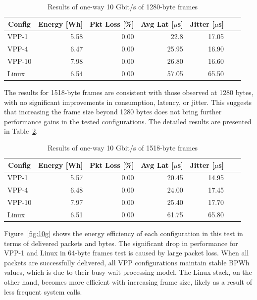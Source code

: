 \begin{table}[h!]
\centering
\caption{Results of one-way 10 Gbit/s of 1280-byte frames}
\begin{tabular}{|l|r|r|r|r|r|r|}
\hline
\multicolumn{1}{|c|}{\textbf{Config}} &
\multicolumn{1}{c|}{\textbf{Energy [Wh] }} &
\multicolumn{1}{c|}{\textbf{Pkt Loss [\%]}} &
\multicolumn{1}{c|}{\textbf{Avg Lat [$\mu$s]}} &
\multicolumn{1}{c|}{\textbf{Jitter [$\mu$s]}} \\
\hline 
VPP-1 & 5.58 & 0.00 & 22.8 & 17.05 \\
VPP-4 & 6.47 & 0.00 & 25.95 & 16.90 \\
VPP-10 & 7.98 & 0.00 & 26.80 & 16.60 \\
Linux & 6.54 & 0.00 & 57.05 & 65.50 \\
\hline
\end{tabular}
\label{tab:10udp:1280B}
\end{table}

The results for 1518-byte frames are consistent with those observed at 1280 bytes, with no significant improvements in consumption, latency, or jitter.
This suggests that increasing the frame size beyond 1280 bytes does not bring further performance gains in the tested configurations.
The detailed results are presented in Table~\ref{tab:10udp:1518B}.

\begin{table}[h!]
\centering
\caption{Results of one-way 10 Gbit/s of 1518-byte frames}
\begin{tabular}{|l|r|r|r|r|r|r|}
\hline
\multicolumn{1}{|c|}{\textbf{Config}} &
\multicolumn{1}{c|}{\textbf{Energy [Wh] }} &
\multicolumn{1}{c|}{\textbf{Pkt Loss [\%]}} &
\multicolumn{1}{c|}{\textbf{Avg Lat [$\mu$s]}} &
\multicolumn{1}{c|}{\textbf{Jitter [$\mu$s]}} \\
\hline 
VPP-1 & 5.57 & 0.00 & 20.45 & 14.95 \\
VPP-4 & 6.48 & 0.00 & 24.00 & 17.45 \\
VPP-10 & 7.97 & 0.00 & 25.40 & 17.70 \\
Linux & 6.51 & 0.00 & 61.75 & 65.80 \\
\hline
\end{tabular}
\label{tab:10udp:1518B}
\end{table}

Figure~\ref{fig:10g} shows the energy efficiency of each configuration in this test in terms of delivered packets and bytes.
The significant drop in performance for VPP-1 and Linux in 64-byte frames test is caused by large packet loss.
When all packets are successfully delivered, all VPP configurations maintain stable BPWh values, which is due to their busy-wait processing model.
The Linux stack, on the other hand, becomes more efficient with increasing frame size, likely as a result of less frequent system calls.

